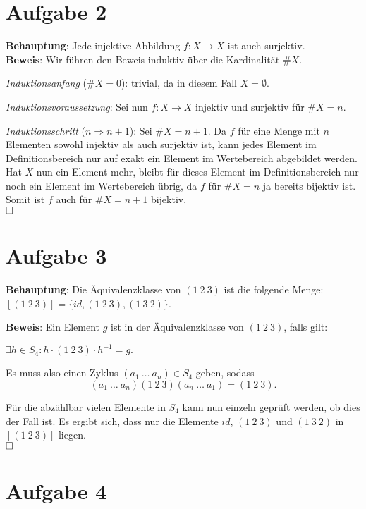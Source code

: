 \documentclass[12pt,a4paper]{article}
\newcommand{\qed}{\null\nobreak\hfill\square}
\begin{document}
\section*{Aufgabe 2}

\textbf{Behauptung}: Jede injektive Abbildung $f: X \rightarrow X$ ist auch surjektiv.\\

\textbf{Beweis}: Wir führen den Beweis induktiv über die Kardinalität $\#X$.

\textit{Induktionsanfang} ($\#X = 0$): trivial, da in diesem Fall $X = \emptyset$.

\textit{Induktionsvoraussetzung}: Sei nun $f: X \rightarrow X$ injektiv und surjektiv für $\#X = n$.

\textit{Induktionsschritt} ($n \Rightarrow n+1$):
Sei $\#X = n+1$.
Da $f$ für eine Menge mit $n$ Elementen sowohl injektiv als auch surjektiv ist, kann jedes Element im Definitionsbereich nur auf exakt ein Element im Wertebereich abgebildet werden.
Hat $X$ nun ein Element mehr, bleibt für dieses Element im Definitionsbereich nur noch ein Element im Wertebereich übrig, da $f$ für $\#X = n$ ja bereits bijektiv ist.
Somit ist $f$ auch für $\#X=n+1$ bijektiv.\\
$\qed$


\section*{Aufgabe 3}

\textbf{Behauptung}: Die Äquivalenzklasse von $(1\ 2\ 3)$ ist die folgende Menge: $[(1\ 2\ 3)] = \{id, (1\ 2\ 3), (1\ 3\ 2)\}$.

\textbf{Beweis}: Ein Element $g$ ist in der Äquivalenzklasse von $(1\ 2\ 3)$, falls gilt:

$\exists h \in S_4: h \cdot (1\ 2\ 3) \cdot h^{-1} = g.$

Es muss also einen Zyklus $(a_1\ \dots\ a_n) \in S_4$ geben, sodass \[(a_1\ \dots\ a_n)(1\ 2\ 3)(a_n\ \dots\ a_1) = (1\ 2\ 3).\]

Für die abzählbar vielen Elemente in $S_4$ kann nun einzeln geprüft werden, ob dies der Fall ist.
Es ergibt sich, dass nur die Elemente $id$, $(1\ 2\ 3)$ und $(1\ 3\ 2)$ in $[(1\ 2\ 3)]$ liegen.\\
$\qed$\pagebreak


\section*{Aufgabe 4}
\end{document}
